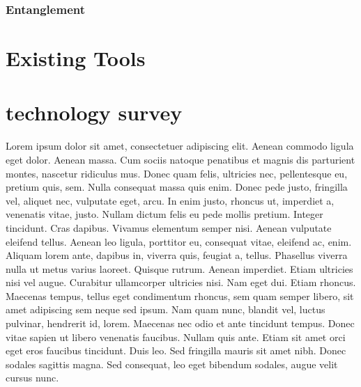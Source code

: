 \subsubsection*{Entanglement}




\section{Existing Tools}


\section{technology survey}

Lorem ipsum dolor sit amet, consectetuer adipiscing elit. Aenean commodo ligula eget dolor. Aenean massa. Cum sociis natoque penatibus et magnis dis parturient montes, nascetur ridiculus mus. Donec quam felis, ultricies nec, pellentesque eu, pretium quis, sem. Nulla consequat massa quis enim. Donec pede justo, fringilla vel, aliquet nec, vulputate eget, arcu. In enim justo, rhoncus ut, imperdiet a, venenatis vitae, justo. Nullam dictum felis eu pede mollis pretium. Integer tincidunt. Cras dapibus. Vivamus elementum semper nisi. Aenean vulputate eleifend tellus. Aenean leo ligula, porttitor eu, consequat vitae, eleifend ac, enim. Aliquam lorem ante, dapibus in, viverra quis, feugiat a, tellus. Phasellus viverra nulla ut metus varius laoreet. Quisque rutrum. Aenean imperdiet. Etiam ultricies nisi vel augue. Curabitur ullamcorper ultricies nisi. Nam eget dui. Etiam rhoncus. Maecenas tempus, tellus eget condimentum rhoncus, sem quam semper libero, sit amet adipiscing sem neque sed ipsum. Nam quam nunc, blandit vel, luctus pulvinar, hendrerit id, lorem. Maecenas nec odio et ante tincidunt tempus. Donec vitae sapien ut libero venenatis faucibus. Nullam quis ante. Etiam sit amet orci eget eros faucibus tincidunt. Duis leo. Sed fringilla mauris sit amet nibh. Donec sodales sagittis magna. Sed consequat, leo eget bibendum sodales, augue velit cursus nunc.
